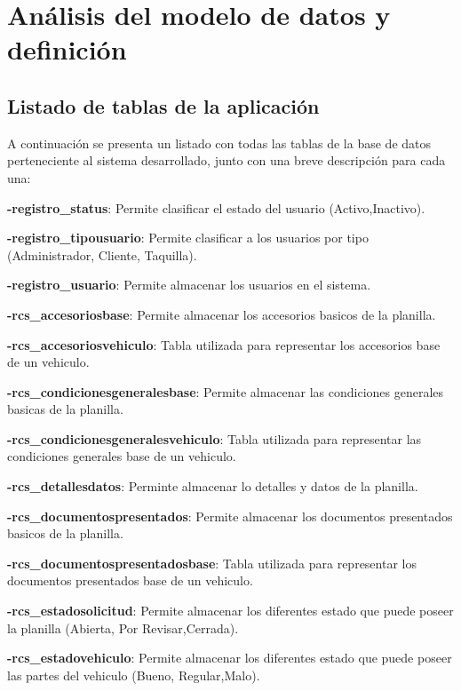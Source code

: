 \section{Análisis del modelo de datos y definición} 
\setlength{\parskip}{5mm}
\setlength{\parskip}{0mm}

\subsection{Listado de tablas de la aplicación}

\setlength{\parskip}{5mm}

A continuación se presenta un listado con todas las tablas de la base de datos perteneciente al sistema desarrollado, junto con una breve descripción para cada una:


\textbf{-registro\_status}: Permite clasificar el estado del usuario (Activo,Inactivo).

\textbf{-registro\_tipousuario}: Permite clasificar a los usuarios por tipo (Administrador, Cliente, Taquilla).

\textbf{-registro\_usuario}: Permite almacenar los usuarios en el sistema.

\textbf{-rcs\_accesoriosbase}: Permite almacenar los accesorios basicos de la planilla.

\textbf{-rcs\_accesoriosvehiculo}: Tabla utilizada para representar los accesorios base de un vehiculo.

\textbf{-rcs\_condicionesgeneralesbase}: Permite almacenar las condiciones generales basicas de la planilla.

\textbf{-rcs\_condicionesgeneralesvehiculo}: Tabla utilizada para representar las condiciones generales base de un vehiculo.

\textbf{-rcs\_detallesdatos}: Perminte almacenar lo detalles y datos de la planilla.

\textbf{-rcs\_documentospresentados}: Permite almacenar los documentos presentados basicos de la planilla.

\textbf{-rcs\_documentospresentadosbase}: Tabla utilizada para representar los documentos presentados base de un vehiculo.

\textbf{-rcs\_estadosolicitud}: Permite almacenar los diferentes estado que puede poseer la planilla (Abierta, Por Revisar,Cerrada).

\textbf{-rcs\_estadovehiculo}: Permite almacenar los diferentes estado que puede poseer las partes del vehiculo (Bueno, Regular,Malo).


